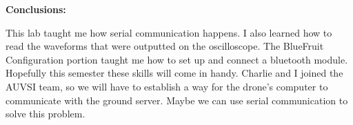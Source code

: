 \documentclass{article}
\begin{document}
\noindent\textbf{Conclusions:}

This lab taught me how serial communication happens. I also learned how to read the waveforms that were outputted on the oscilloscope. The BlueFruit Configuration portion taught me how to set up and connect a bluetooth module. Hopefully this semester these skills will come in handy. Charlie and I joined the AUVSI team, so we will have to establish a way for the drone's computer to communicate with the ground server. Maybe we can use serial communication to solve this problem.

\end{document}
